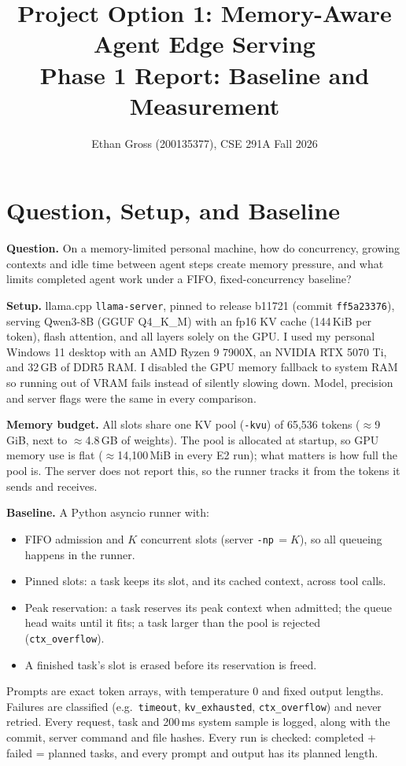 \documentclass[10pt]{article}
\title{\vspace{-1.6em}%
Project Option 1: Memory-Aware Agent Edge Serving\\
Phase 1 Report: Baseline and Measurement\vspace{-0.4em}}
\author{\quad Ethan Gross (200135377), CSE 291A Fall 2026}
\date{\vspace{-1.2em}}
\begin{document}
\maketitle

\section{Question, Setup, and Baseline}
\textbf{Question.} On a memory-limited personal machine, how do concurrency, growing contexts and idle time between
agent steps create memory pressure, and what limits completed agent work under a FIFO, fixed-concurrency baseline?

\textbf{Setup.} llama.cpp \texttt{llama-server}, pinned to release b11721 (commit \texttt{ff5a23376}), serving Qwen3-8B
(GGUF Q4\_K\_M) with an fp16 KV cache (144\,KiB per token), flash attention, and all layers solely on the GPU. I used my personal
Windows 11 desktop with an AMD Ryzen 9 7900X, an NVIDIA RTX 5070 Ti, and 32\,GB of DDR5 RAM. I disabled the GPU memory fallback to
system RAM so running out of VRAM fails instead of silently slowing down. Model, precision and server flags
were the same in every comparison.

\textbf{Memory budget.} All slots share one KV pool (\texttt{-kvu}) of 65,536 tokens ($\approx$9\,GiB, next to
$\approx$4.8\,GB of weights). The pool is allocated at startup, so GPU memory use is flat ($\approx$14,100\,MiB in every E2
run); what matters is how full the pool is. The server does not report this, so the runner tracks it from the tokens it
sends and receives.

\textbf{Baseline.} A Python asyncio runner with:
\begin{itemize}
\item FIFO admission and $K$ concurrent slots (server \texttt{-np}\,$=K$), so all queueing happens in the runner.
\item Pinned slots: a task keeps its slot, and its cached context, across tool calls.
\item Peak reservation: a task reserves its peak context when admitted; the queue head waits until it fits; a task
larger than the pool is rejected (\texttt{ctx\_overflow}).
\item A finished task's slot is erased before its reservation is freed.
\end{itemize}
Prompts are exact token arrays, with temperature 0 and fixed output lengths. Failures are classified (e.g.\
\texttt{timeout}, \texttt{kv\_exhausted}, \texttt{ctx\_overflow}) and never retried. Every request, task and 200\,ms
system sample is logged, along with the commit, server command and file hashes. Every run is checked: completed +
failed = planned tasks, and every prompt and output has its planned length.
\end{document}
